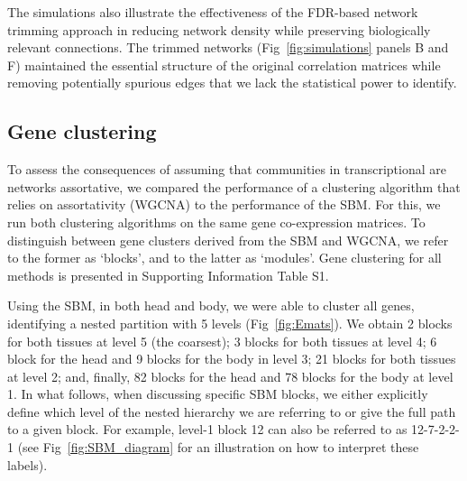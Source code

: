 \documentclass[
]{article}
\begin{document}
The simulations also illustrate the effectiveness of the FDR-based
network trimming approach in reducing network density while preserving
biologically relevant connections. The trimmed networks
(Fig~\ref{fig:simulations} panels B and F) maintained the essential
structure of the original correlation matrices while removing
potentially spurious edges that we lack the statistical power to
identify.

\subsection{Gene clustering}\label{gene-clustering}

To assess the consequences of assuming that communities in
transcriptional are networks assortative, we compared the performance of
a clustering algorithm that relies on assortativity (WGCNA) to the
performance of the SBM. For this, we run both clustering algorithms on
the same gene co-expression matrices. To distinguish between gene
clusters derived from the SBM and WGCNA, we refer to the former as
`blocks', and to the latter as `modules'. Gene clustering for all
methods is presented in Supporting Information Table S1.

Using the SBM, in both head and body, we were able to cluster all genes,
identifying a nested partition with 5 levels (Fig~\ref{fig:Emats}). We
obtain 2 blocks for both tissues at level 5 (the coarsest); 3 blocks for
both tissues at level 4; 6 block for the head and 9 blocks for the body
in level 3; 21 blocks for both tissues at level 2; and, finally, 82
blocks for the head and 78 blocks for the body at level 1. In what
follows, when discussing specific SBM blocks, we either explicitly
define which level of the nested hierarchy we are referring to or give
the full path to a given block. For example, level-1 block 12 can also
be referred to as 12-7-2-2-1 (see Fig~\ref{fig:SBM_diagram} for an
illustration on how to interpret these labels).
\end{document}
